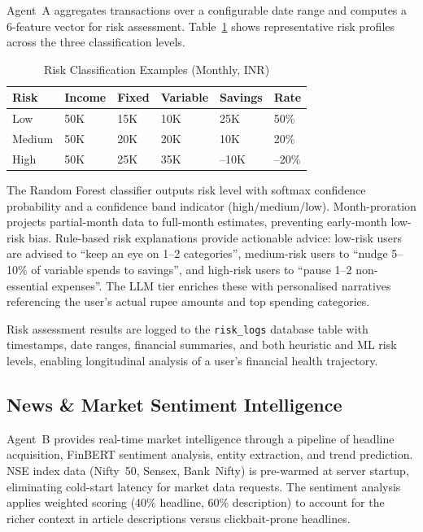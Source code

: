 \documentclass[conference]{IEEEtran}
\begin{document}
Agent~A aggregates transactions over a configurable date range and computes a 6-feature vector for risk assessment. Table~\ref{tab:risk} shows representative risk profiles across the three classification levels.

\begin{table}[!t]
\centering
\caption{Risk Classification Examples (Monthly, INR)}
\label{tab:risk}
\renewcommand{\arraystretch}{1.15}
\footnotesize
\begin{tabular}{p{1.3cm} p{0.9cm} p{0.9cm} p{0.9cm} p{0.9cm} p{0.9cm}}
\toprule
\textbf{Risk} & \textbf{Income} & \textbf{Fixed} & \textbf{Variable} & \textbf{Savings} & \textbf{Rate} \\
\midrule
Low    & 50K & 15K & 10K & 25K & 50\% \\
Medium & 50K & 20K & 20K & 10K & 20\% \\
High   & 50K & 25K & 35K & --10K & --20\% \\
\bottomrule
\end{tabular}
\end{table}

The Random Forest classifier outputs risk level with softmax confidence probability and a confidence band indicator (high/medium/low). Month-proration projects partial-month data to full-month estimates, preventing early-month low-risk bias. Rule-based risk explanations provide actionable advice: low-risk users are advised to ``keep an eye on 1--2 categories'', medium-risk users to ``nudge 5--10\% of variable spends to savings'', and high-risk users to ``pause 1--2 non-essential expenses''. The LLM tier enriches these with personalised narratives referencing the user's actual rupee amounts and top spending categories.

Risk assessment results are logged to the \texttt{risk\_logs} database table with timestamps, date ranges, financial summaries, and both heuristic and ML risk levels, enabling longitudinal analysis of a user's financial health trajectory.

\subsection{News \& Market Sentiment Intelligence}

Agent~B provides real-time market intelligence through a pipeline of headline acquisition, FinBERT sentiment analysis, entity extraction, and trend prediction. NSE index data (Nifty~50, Sensex, Bank~Nifty) is pre-warmed at server startup, eliminating cold-start latency for market data requests. The sentiment analysis applies weighted scoring (40\% headline, 60\% description) to account for the richer context in article descriptions versus clickbait-prone headlines.
\end{document}
